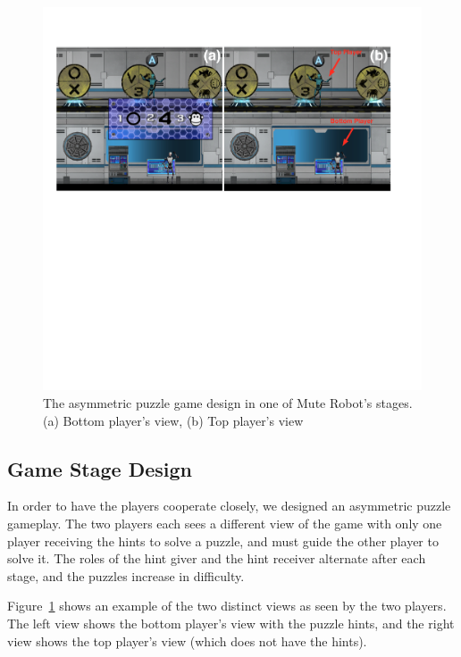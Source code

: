 \begin{figure}[!h]
\centering
\includegraphics[width=1.0\columnwidth]{Figures/GD_F2.pdf}
\caption{The asymmetric puzzle game design in one of Mute Robot's stages. (a) Bottom player's view, (b) Top player's view}
\label{fig:GD_F2}
\end{figure}


\subsection{Game Stage Design}


In order to have the players cooperate closely, we designed an asymmetric puzzle gameplay. The two players each sees a different view of the game with only one player receiving the hints to solve a puzzle, and must guide the other player to solve it. The roles of the hint giver and the hint receiver alternate after each stage, and the puzzles increase in difficulty. 

Figure~\ref{fig:GD_F2} shows an example of the two distinct views as seen by the two players. The left view shows the bottom player's view with the puzzle hints, and the right view shows the top player's view (which does not have the hints). 

